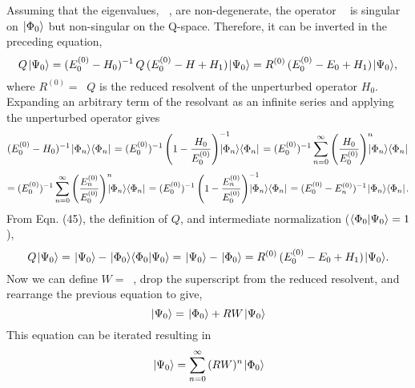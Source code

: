 \documentclass[thesis.tex]{subfiles}
\begin{document}
Assuming that the eigenvalues, $\mathop{E^{(0)}_{n}}$, are non-degenerate, the operator $\mathop{(E^{(0)}_{0}-H_{0})}$ is singular on $\hspace{1pt}\lvert \Phi_{0} \rangle$ but non-singular on the Q-space. Therefore, it can be inverted in the preceding equation,
\begin{equation}
Q\hspace{1pt}\lvert \Psi_{0} \rangle=\mathop{(E^{(0)}_{0}-H_{0})^{-1}}Q\mathop{(E^{(0)}_{0}-H+H_{1})}\hspace{1pt}\lvert \Psi_{0} \rangle=R^{(0)}\mathop{(E^{(0)}_{0}-E_{0}+H_{1})}\hspace{1pt}\lvert \Psi_{0} \rangle,
\end{equation}
where $R^{(0)}=\mathop{(E^{(0)}_{0}-H_{0})^{-1}}Q$ is the reduced resolvent of the unperturbed operator $H_{0}$. Expanding an arbitrary term of the resolvant as an infinite series and applying the unperturbed operator gives
\begin{equation}
\mathop{(E^{(0)}_{0}-H_{0})^{-1}}\ket{\Phi_{n}}\bra{\Phi_{n}}=\mathop{(E^{(0)}_{0})^{-1}}\mathop{\left(1-\frac{H_{0}}{E^{(0)}_{0}}\right)^{-1}}\hspace{-4mm}\ket{\Phi_{n}}\bra{\Phi_{n}}=\mathop{(E^{(0)}_{0})^{-1}}\sum_{n=0}^{\infty}\mathop{\left(\frac{H_{0}}{E^{(0)}_{0}}\right)^{n}}\hspace{-2mm}\ket{\Phi_{n}}\bra{\Phi_{n}}
\end{equation}
\begin{equation}
=\mathop{(E^{(0)}_{0})^{-1}}\sum_{n=0}^{\infty}\mathop{\left(\frac{E^{(0)}_{n}}{E^{(0)}_{0}}\right)^{n}}\hspace{-2mm}\ket{\Phi_{n}}\bra{\Phi_{n}}=\mathop{(E^{(0)}_{0})^{-1}}\mathop{\left(1-\frac{E^{(0)}_{n}}{E^{(0)}_{0}}\right)^{-1}}\hspace{-4mm}\ket{\Phi_{n}}\bra{\Phi_{n}}=\mathop{(E^{(0)}_{0}-E^{(0)}_{n})^{-1}}\ket{\Phi_{n}}\bra{\Phi_{n}}.
\end{equation}
From Eqn. (45), the definition of $Q$, and intermediate normalization ($\langle \Phi_{0} | \Psi_{0}\rangle=1$),
\begin{equation}
Q\hspace{1pt}\lvert \Psi_{0} \rangle=\hspace{1pt}\lvert \Psi_{0} \rangle-\hspace{1pt}\lvert \Phi_{0} \rangle\langle \Phi_{0} | \Psi_{0}\rangle=\hspace{1pt}\lvert \Psi_{0} \rangle-\hspace{1pt}\lvert \Phi_{0} \rangle=R^{(0)}\mathop{(E^{(0)}_{0}-E_{0}+H_{1})}\hspace{1pt}\lvert \Psi_{0} \rangle.
\end{equation}
Now we can define $W=\mathop{(E^{(0)}_{0}-E_{0}+H_{1})}$, drop the superscript from the reduced resolvent, and rearrange the previous equation to give,
\begin{equation}
\hspace{1pt}\lvert \Psi_{0} \rangle=\hspace{1pt}\lvert \Phi_{0} \rangle+RW\hspace{1pt}\lvert \Psi_{0} \rangle
\end{equation}
This equation can be iterated resulting in
\begin{equation}
\hspace{1pt}\lvert \Psi_{0} \rangle=\sum_{n=0}^{\infty}\mathop{(RW)^{n}}\hspace{1pt}\lvert \Phi_{0} \rangle
\end{equation}
\end{document}
